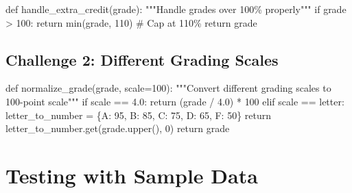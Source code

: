 \documentclass[
  letterpaper,
  DIV=11,
  numbers=noendperiod,
  oneside]{scrreprt}
\newenvironment{Shaded}{}{}
\newcommand{\BuiltInTok}[1]{\textcolor[rgb]{0.84,0.23,0.29}{#1}}
\newcommand{\CommentTok}[1]{\textcolor[rgb]{0.42,0.45,0.49}{#1}}
\newcommand{\ControlFlowTok}[1]{\textcolor[rgb]{0.84,0.23,0.29}{#1}}
\newcommand{\DecValTok}[1]{\textcolor[rgb]{0.00,0.36,0.77}{#1}}
\newcommand{\FloatTok}[1]{\textcolor[rgb]{0.00,0.36,0.77}{#1}}
\newcommand{\KeywordTok}[1]{\textcolor[rgb]{0.84,0.23,0.29}{#1}}
\newcommand{\NormalTok}[1]{\textcolor[rgb]{0.14,0.16,0.18}{#1}}
\newcommand{\OperatorTok}[1]{\textcolor[rgb]{0.14,0.16,0.18}{#1}}
\newcommand{\StringTok}[1]{\textcolor[rgb]{0.01,0.18,0.38}{#1}}
\begin{document}
\begin{Shaded}
\begin{Highlighting}[]
\KeywordTok{def}\NormalTok{ handle\_extra\_credit(grade):}
    \CommentTok{"""Handle grades over 100\% properly"""}
    \ControlFlowTok{if}\NormalTok{ grade }\OperatorTok{\textgreater{}} \DecValTok{100}\NormalTok{:}
        \ControlFlowTok{return} \BuiltInTok{min}\NormalTok{(grade, }\DecValTok{110}\NormalTok{)  }\CommentTok{\# Cap at 110\%}
    \ControlFlowTok{return}\NormalTok{ grade}
\end{Highlighting}
\end{Shaded}

\subsection{Challenge 2: Different Grading
Scales}\label{challenge-2-different-grading-scales}

\begin{Shaded}
\begin{Highlighting}[]
\KeywordTok{def}\NormalTok{ normalize\_grade(grade, scale}\OperatorTok{=}\StringTok{\textquotesingle{}100\textquotesingle{}}\NormalTok{):}
    \CommentTok{"""Convert different grading scales to 100{-}point scale"""}
    \ControlFlowTok{if}\NormalTok{ scale }\OperatorTok{==} \StringTok{\textquotesingle{}4.0\textquotesingle{}}\NormalTok{:}
        \ControlFlowTok{return}\NormalTok{ (grade }\OperatorTok{/} \FloatTok{4.0}\NormalTok{) }\OperatorTok{*} \DecValTok{100}
    \ControlFlowTok{elif}\NormalTok{ scale }\OperatorTok{==} \StringTok{\textquotesingle{}letter\textquotesingle{}}\NormalTok{:}
\NormalTok{        letter\_to\_number }\OperatorTok{=}\NormalTok{ \{}\StringTok{\textquotesingle{}A\textquotesingle{}}\NormalTok{: }\DecValTok{95}\NormalTok{, }\StringTok{\textquotesingle{}B\textquotesingle{}}\NormalTok{: }\DecValTok{85}\NormalTok{, }\StringTok{\textquotesingle{}C\textquotesingle{}}\NormalTok{: }\DecValTok{75}\NormalTok{, }\StringTok{\textquotesingle{}D\textquotesingle{}}\NormalTok{: }\DecValTok{65}\NormalTok{, }\StringTok{\textquotesingle{}F\textquotesingle{}}\NormalTok{: }\DecValTok{50}\NormalTok{\}}
        \ControlFlowTok{return}\NormalTok{ letter\_to\_number.get(grade.upper(), }\DecValTok{0}\NormalTok{)}
    \ControlFlowTok{return}\NormalTok{ grade}
\end{Highlighting}
\end{Shaded}

\section{Testing with Sample Data}\label{testing-with-sample-data}
\end{document}
